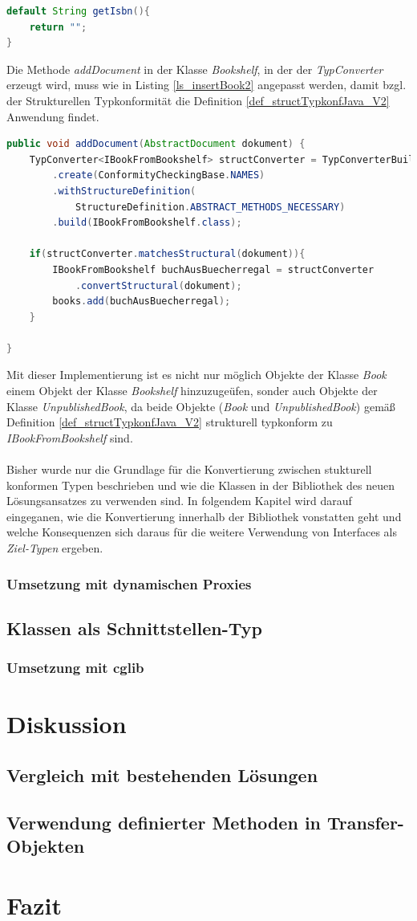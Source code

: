 \documentclass[11pt, 
ngerman,
doublespacing,
chapterinoneline, %
consistentlayout, %
]{scrartcl}
\begin{document}
\begin{lstlisting}[language=Java, label=ls_getIsbn, caption=Default-Implementierung getIsbn]
default String getIsbn(){
	return "";
}
\end{lstlisting}
Die Methode \emph{addDocument} in der Klasse \emph{Bookshelf}, in der der \emph{TypConverter} erzeugt wird, muss wie in Listing \ref{ls_insertBook2} angepasst werden, damit bzgl. der Strukturellen Typkonformität die Definition \ref{def_structTypkonfJava_V2} Anwendung findet.
\begin{lstlisting}[language=Java, label=ls_insertBook2, caption=addDocument]
public void addDocument(AbstractDocument dokument) {
	TypConverter<IBookFromBookshelf> structConverter = TypConverterBuilder
		.create(ConformityCheckingBase.NAMES)
		.withStructureDefinition(
			StructureDefinition.ABSTRACT_METHODS_NECESSARY)
		.build(IBookFromBookshelf.class);

	if(structConverter.matchesStructural(dokument)){
		IBookFromBookshelf buchAusBuecherregal = structConverter
			.convertStructural(dokument);
		books.add(buchAusBuecherregal);
	}	
	
}
\end{lstlisting}
Mit dieser Implementierung ist es nicht nur möglich Objekte der Klasse \emph{Book} einem Objekt der Klasse \emph{Bookshelf} hinzuzugeüfen, sonder auch Objekte der Klasse \emph{UnpublishedBook}, da beide Objekte (\emph{Book} und \emph{UnpublishedBook}) gemäß Definition \ref{def_structTypkonfJava_V2} strukturell typkonform zu \emph{IBookFromBookshelf} sind.\\\\
Bisher wurde nur die Grundlage für die Konvertierung zwischen stukturell konformen Typen beschrieben und wie die Klassen in der Bibliothek des neuen Lösungsansatzes zu verwenden sind. In folgendem Kapitel wird darauf eingeganen, wie die Konvertierung innerhalb der Bibliothek vonstatten geht und welche Konsequenzen sich daraus für die weitere Verwendung von Interfaces als \emph{Ziel-Typen} ergeben.
\subsubsection{Umsetzung mit dynamischen Proxies}

\cite{proxy}
\subsection{Klassen als Schnittstellen-Typ}\label{sec_classes}
\subsubsection{Umsetzung mit cglib}
\cite{cglib}
\section{Diskussion}
\subsection{Vergleich mit bestehenden Lösungen}
\subsection{Verwendung definierter Methoden in Transfer-Objekten}
\section{Fazit}

{}

\nocite{*}
\end{document}
